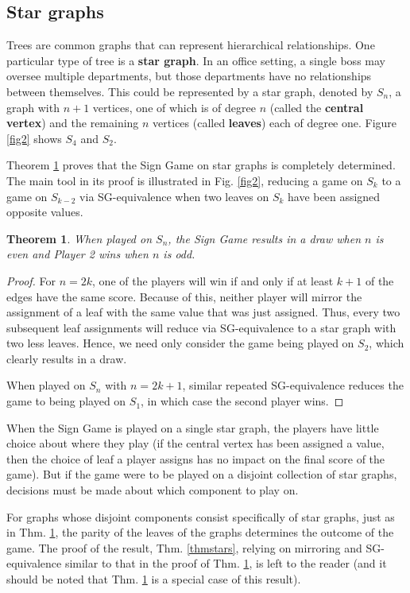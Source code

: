 \documentclass[amsart,11pt]{article}
\theoremstyle{dotless}
\theoremstyle{dotless}
\newtheorem{thm}{Theorem}[section]
\begin{document}
\subsection{Star graphs}

Trees are common graphs that can represent hierarchical relationships. One particular type of tree is a \textbf{star graph}. In an office setting, a single boss may oversee multiple departments, but those departments have no relationships between themselves. This could be represented by a star graph, denoted by $S_n$, a graph with $n+1$ vertices, one of which is of degree $n$ (called the \textbf{central vertex}) and the remaining $n$ vertices (called \textbf{leaves}) each of degree one. Figure \ref{fig2} shows $S_4$ and $S_2$.

Theorem \ref{thm2} proves that the Sign Game on star graphs is completely determined. The main tool in its proof is illustrated in Fig. \ref{fig2}, reducing a game on $S_k$ to a game on $S_{k-2}$ via SG-equivalence when two leaves on $S_k$ have been assigned opposite values.

\begin{thm} \label{thm2}
When played on $S_n$, the Sign Game results in a draw when $n$ is even and Player 2 wins when $n$ is odd.
\end{thm}
\begin{proof}
 For $n=2k$, one of the players will win if and only if at least $k+1$ of the edges have the same score. Because of this, neither player will mirror the assignment of a leaf with the same value that was just assigned. Thus, every two subsequent leaf assignments will reduce via SG-equivalence to a star graph with two less leaves. Hence, we need only consider the game being played on $S_2$, which clearly results in a draw.

When played on $S_n$ with $n = 2k+1$, similar repeated SG-equivalence reduces the game to being played on $S_1$, in which case the second player wins.
\end{proof}

When the Sign Game is played on a single star graph, the players have little choice about where they play (if the central vertex has been assigned a value, then the choice of leaf a player assigns has no impact on the final score of the game). But if the game were to be played on a disjoint collection of star graphs, decisions must be made about which component to play on. 

For graphs whose disjoint components consist specifically of star graphs, just as in Thm. \ref{thm2}, the parity of the leaves of the graphs determines the outcome of the game. The proof of the result, Thm. \ref{thmstars}, relying on mirroring and SG-equivalence similar to that in the proof of Thm. \ref{thm2}, is left to the reader (and it should be noted that Thm. \ref{thm2} is a special case of this result).
\end{document}
